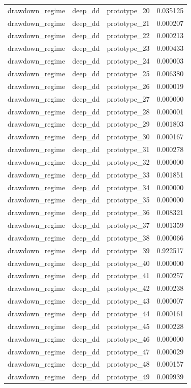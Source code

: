\begin{tabular}{lllr}
drawdown\_regime & deep\_dd & prototype\_20 & 0.035125 \\
drawdown\_regime & deep\_dd & prototype\_21 & 0.000207 \\
drawdown\_regime & deep\_dd & prototype\_22 & 0.000213 \\
drawdown\_regime & deep\_dd & prototype\_23 & 0.000433 \\
drawdown\_regime & deep\_dd & prototype\_24 & 0.000003 \\
drawdown\_regime & deep\_dd & prototype\_25 & 0.006380 \\
drawdown\_regime & deep\_dd & prototype\_26 & 0.000019 \\
drawdown\_regime & deep\_dd & prototype\_27 & 0.000000 \\
drawdown\_regime & deep\_dd & prototype\_28 & 0.000001 \\
drawdown\_regime & deep\_dd & prototype\_29 & 0.001803 \\
drawdown\_regime & deep\_dd & prototype\_30 & 0.000167 \\
drawdown\_regime & deep\_dd & prototype\_31 & 0.000278 \\
drawdown\_regime & deep\_dd & prototype\_32 & 0.000000 \\
drawdown\_regime & deep\_dd & prototype\_33 & 0.001851 \\
drawdown\_regime & deep\_dd & prototype\_34 & 0.000000 \\
drawdown\_regime & deep\_dd & prototype\_35 & 0.000000 \\
drawdown\_regime & deep\_dd & prototype\_36 & 0.008321 \\
drawdown\_regime & deep\_dd & prototype\_37 & 0.001359 \\
drawdown\_regime & deep\_dd & prototype\_38 & 0.000066 \\
drawdown\_regime & deep\_dd & prototype\_39 & 0.922517 \\
drawdown\_regime & deep\_dd & prototype\_40 & 0.000000 \\
drawdown\_regime & deep\_dd & prototype\_41 & 0.000257 \\
drawdown\_regime & deep\_dd & prototype\_42 & 0.000238 \\
drawdown\_regime & deep\_dd & prototype\_43 & 0.000007 \\
drawdown\_regime & deep\_dd & prototype\_44 & 0.000161 \\
drawdown\_regime & deep\_dd & prototype\_45 & 0.000228 \\
drawdown\_regime & deep\_dd & prototype\_46 & 0.000000 \\
drawdown\_regime & deep\_dd & prototype\_47 & 0.000029 \\
drawdown\_regime & deep\_dd & prototype\_48 & 0.000157 \\
drawdown\_regime & deep\_dd & prototype\_49 & 0.009939 \\
\bottomrule
\end{tabular}
